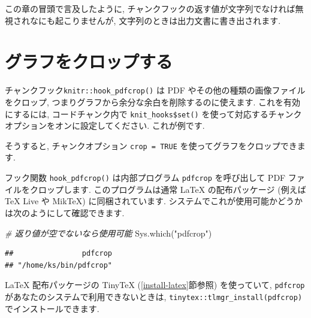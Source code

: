 \documentclass[
  11pt,
  lualatex,
  ja=standard]{bxjsreport}
\newenvironment{Shaded}{\begin{snugshade}}{\end{snugshade}}
\newcommand{\AttributeTok}[1]{\textcolor[rgb]{0.77,0.63,0.00}{#1}}
\newcommand{\CommentTok}[1]{\textcolor[rgb]{0.56,0.35,0.01}{\textit{#1}}}
\newcommand{\FunctionTok}[1]{\textcolor[rgb]{0.00,0.00,0.00}{#1}}
\newcommand{\NormalTok}[1]{#1}
\newcommand{\SpecialCharTok}[1]{\textcolor[rgb]{0.00,0.00,0.00}{#1}}
\newcommand{\StringTok}[1]{\textcolor[rgb]{0.31,0.60,0.02}{#1}}
\begin{document}
この章の冒頭で言及したように, チャンクフックの返す値が文字列でなければ無視されなにも起こりませんが, 文字列のときは出力文書に書き出されます.

\hypertarget{crop-plot}{%
\section{グラフをクロップする}\label{crop-plot}}

チャンクフック\texttt{knitr::hook\_pdfcrop()} は PDF やその他の種類の画像ファイルをクロップ, つまりグラフから余分な余白を削除するのに使えます. これを有効にするには, コードチャンク内で \texttt{knit\_hooks\$set()} を使って対応するチャンクオプションをオンに設定してください. これが例です.

\begin{Shaded}
\end{Shaded}

そうすると, チャンクオプション \texttt{crop = TRUE} を使ってグラフをクロップできます.

フック関数 \texttt{hook\_pdfcrop()} は内部プログラム \texttt{pdfcrop} を呼び出して PDF ファイルをクロップします. このプログラムは通常 LaTeX の配布パッケージ (例えば TeX Live や MikTeX) に同梱されています. システムでこれが使用可能かどうかは次のようにして確認できます.

\begin{Shaded}
\begin{Highlighting}[numbers=left,,]
\CommentTok{\# 返り値が空でないなら使用可能}
\FunctionTok{Sys.which}\NormalTok{(}\StringTok{"pdfcrop"}\NormalTok{)}
\end{Highlighting}
\end{Shaded}

\begin{verbatim}
##                pdfcrop 
## "/home/ks/bin/pdfcrop"
\end{verbatim}

LaTeX 配布パッケージの TinyTeX (\ref{install-latex}節参照) を使っていて, \texttt{pdfcrop} があなたのシステムで利用できないときは, \texttt{tinytex::tlmgr\_install(\textquotesingle{}pdfcrop\textquotesingle{})} でインストールできます.
\end{document}
